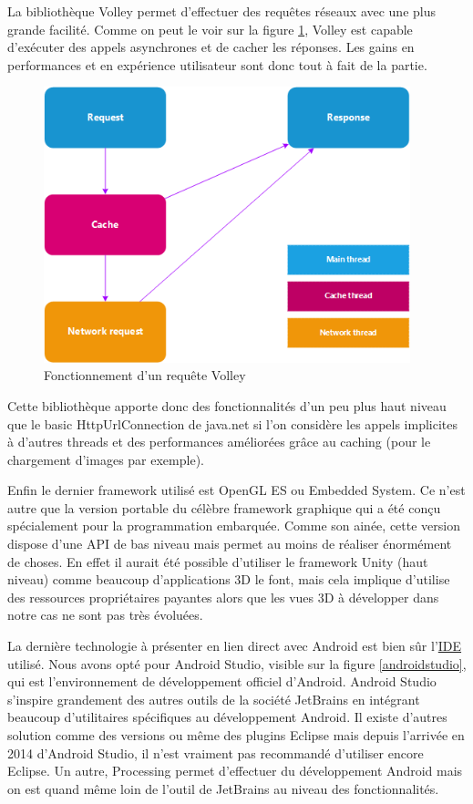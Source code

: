 La bibliothèque Volley permet d’effectuer des requêtes réseaux avec une plus grande facilité. Comme on peut le voir sur la figure \ref{volley}, Volley est capable d’exécuter des appels asynchrones et de cacher les réponses. Les gains en performances et en expérience utilisateur sont donc tout à fait de la partie.

\begin{figure}[H]
    \centering
    \includegraphics[height=8cm]{./img/volley.png}
    \caption{Fonctionnement d’un requête Volley}
    \label{volley}
\end{figure}

Cette bibliothèque apporte donc des fonctionnalités d’un peu plus haut niveau que le basic HttpUrlConnection de java.net si l’on considère les appels implicites à d’autres threads et des performances améliorées grâce au caching (pour le chargement d’images par exemple).

Enfin le dernier framework utilisé est OpenGL ES ou Embedded System. Ce n’est autre que la version portable du célèbre framework graphique qui a été conçu spécialement pour la programmation embarquée. Comme son ainée, cette version dispose d’une API de bas niveau mais permet au moins de réaliser énormément de choses. En effet il aurait été possible d’utiliser le framework Unity (haut niveau) comme beaucoup d’applications 3D le font, mais cela implique d’utilise des ressources propriétaires payantes alors que les vues 3D à développer dans notre cas ne sont pas très évoluées.

La dernière technologie à présenter en lien direct avec Android est bien sûr l’\underline{IDE} utilisé. Nous avons opté pour Android Studio, visible sur la figure \ref{androidstudio}, qui est l’environnement de développement officiel d’Android. Android Studio s’inspire grandement des autres outils de la société JetBrains en intégrant beaucoup d’utilitaires spécifiques au développement Android. Il existe d’autres solution comme des versions ou même des plugins Eclipse mais depuis l’arrivée en 2014 d’Android Studio, il n’est vraiment pas recommandé d’utiliser encore Eclipse. Un autre, Processing permet d’effectuer du développement Android mais on est quand même loin de l’outil de JetBrains au niveau des fonctionnalités.

